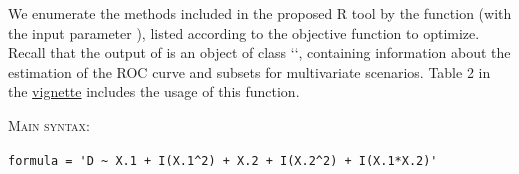 We enumerate the methods included in the proposed R tool by the  function (with the input parameter ), listed according to the objective function to optimize. Recall that the output of  is an object of class ``, containing information about the estimation of the ROC curve and subsets for multivariate scenarios. Table 2 in the \href{https://cran.r-project.org/web/packages/movieROC/vignettes/movieROC_vignette.pdf}{vignette} includes the usage of this function.

\textsc{Main syntax:}  \par \hspace{3mm}
  \par \hspace{1.8cm}
\verb"formula = 'D ~ X.1 + I(X.1^2) + X.2 + I(X.2^2) + I(X.1*X.2)'" 


